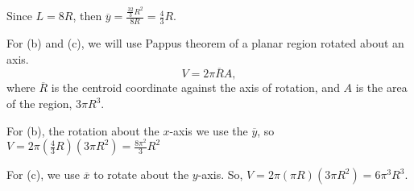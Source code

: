 \documentclass[../hw10]{subfiles}
\begin{document}
Since $L=8R$, then $\overline{y}=\frac{\frac{32}{3}R^2}{8R}=\frac{4}{3}R$.

For (b) and (c), we will use Pappus theorem of a planar region rotated about an axis. 
\[V=2\pi\overline{R}A,\]
where $\overline{R}$ is the centroid coordinate against the axis of rotation, and $A$ is the area of the region, $3\pi R^3$.



For (b), the rotation about the $x$-axis we use the $\overline{y}$, so $V=2\pi\left( \frac{4}{3}R \right)(3\pi R^2) = \frac{8\pi^2}{3}R^2$

For (c), we use $\overline{x}$ to rotate about the $y$-axis.
So, $V=2\pi(\pi R)(3 \pi R^2)=6\pi^3 R^3$.
\end{document}
